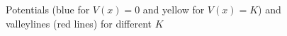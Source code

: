 \documentclass[12pt,a4paper]{article}
\begin{document}
\begin{figure}[h]
\centering
{}
\caption{Potentials (blue for $V(x) = 0$ and yellow for $V(x) = K$) and valleylines (red lines) for different $K$}
\label{fig:7}
\end{figure}
\end{document}
